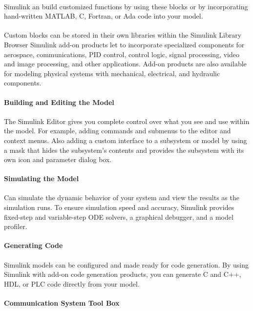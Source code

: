 \documentclass[14pt]{report}
\begin{document}
{\paragraph{} Simulink an build customized functions by using these blocks or by incorporating hand-written MATLAB, C, Fortran, or Ada code into your model.
\paragraph{} Custom blocks can be stored in their own libraries within the Simulink Library Browser
Simulink add-on products let to incorporate specialized components for aerospace, communications, PID control, control logic, signal processing, video and image processing, and other applications. Add-on products are also available for modeling physical systems with mechanical, electrical, and hydraulic components.\\
\\
\textbf{Building and Editing the Model}
\paragraph{} The Simulink Editor gives you complete control over what you see and use within the model.  For example, adding commands and submenus to the editor and context menus.  Also adding a custom interface to a subsystem or model by using a mask that hides the subsystem's contents and provides the subsystem with its own icon and parameter dialog box.\\
\\
\textbf{Simulating the Model}
\paragraph{} Can simulate the dynamic behavior of your system and view the results as the simulation runs. To ensure simulation speed and accuracy, Simulink provides fixed-step and variable-step ODE solvers, a graphical debugger, and a model profiler.\\
\\
\textbf{Generating Code}
\paragraph{} Simulink models can be configured and made ready for code generation. By using Simulink with add-on code generation products, you can generate C and C++, HDL, or PLC code directly from your model.\\
\\
\textbf{Communication System Tool Box}
}
\end{document}
